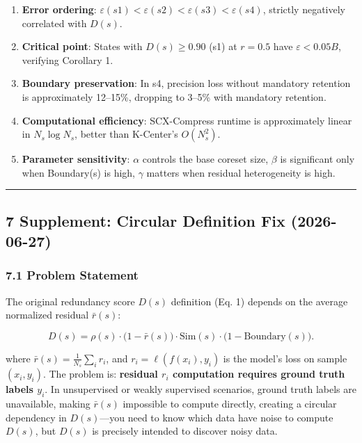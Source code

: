 \documentclass[
  12pt,
]{article}
\providecommand{\tightlist}{%
  \setlength{\itemsep}{0pt}\setlength{\parskip}{0pt}}
\begin{document}
\begin{enumerate}
\def\labelenumi{\arabic{enumi}.}
\tightlist
\item
  \textbf{Error ordering}: \(\varepsilon(s1) < \varepsilon(s2) < \varepsilon(s3) < \varepsilon(s4)\), strictly negatively correlated with \(D(s)\).
\item
  \textbf{Critical point}: States with \(D(s) \geq 0.90\) (s1) at \(r = 0.5\) have \(\varepsilon < 0.05B\), verifying Corollary 1.
\item
  \textbf{Boundary preservation}: In s4, precision loss without mandatory retention is approximately 12--15\%, dropping to 3--5\% with mandatory retention.
\item
  \textbf{Computational efficiency}: SCX-Compress runtime is approximately linear in \(N_s \log N_s\), better than K-Center's \(O(N_s^2)\).
\item
  \textbf{Parameter sensitivity}: \(\alpha\) controls the base coreset size, \(\beta\) is significant only when Boundary(s) is high, \(\gamma\) matters when residual heterogeneity is high.
\end{enumerate}

\begin{center}\rule{0.5\linewidth}{0.5pt}\end{center}

\subsection{7 Supplement: Circular Definition Fix (2026-06-27)}\label{circular-definition-fix}

\subsubsection{7.1 Problem Statement}\label{problem-statement-fix}

The original redundancy score \(D(s)\) definition (Eq. 1) depends on the average normalized residual \(\bar{r}(s)\):

\[
D(s) = \rho(s) \cdot \bigl(1 - \bar{r}(s)\bigr) \cdot \text{Sim}(s) \cdot \bigl(1 - \text{Boundary}(s)\bigr).
\]

where \(\bar{r}(s) = \frac{1}{N_s}\sum_i r_i\), and
\(r_i = \ell(f(x_i), y_i)\) is the model's loss on sample \((x_i, y_i)\).
The problem is: \textbf{residual \(r_i\) computation requires ground truth labels \(y_i\)}. In unsupervised or weakly supervised scenarios, ground truth labels are unavailable, making \(\bar{r}(s)\) impossible to compute directly, creating a circular dependency in \(D(s)\)---you need to know which data have noise to compute \(D(s)\), but \(D(s)\) is precisely intended to discover noisy data.
\end{document}
